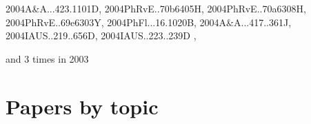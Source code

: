 \documentclass[12pt]{article}
\begin{document}
\begin{description}
{2004A&A...423.1101D,%
2004PhRvE..70b6405H,%
2004PhRvE..70a6308H,%
2004PhRvE..69e6303Y,%
2004PhFl...16.1020B,%
2004A&A...417..361J,%
2004IAUS..219..656D,%
2004IAUS..223..239D%
},\item
and 3 times in 2003 \citep{
2003A&A...411..321Y,%
2003ApJ...597L.141H,%
2003PhRvE..68b6304D%
}
\end{description}

\section{Papers by topic}
\end{document}
